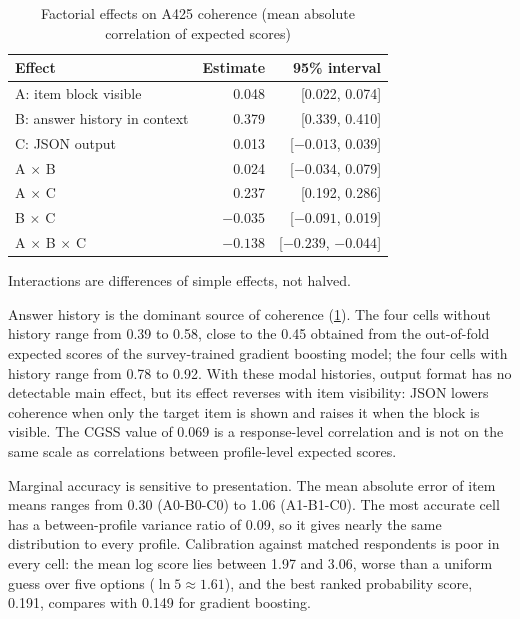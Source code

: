 \documentclass[11pt]{article}
\begin{document}
\begin{table}[H]
\centering
\caption{Factorial effects on A425 coherence (mean absolute correlation of expected scores)}
\label{tab:v2effects}
\small
\begin{tabular}{lrr}
\toprule
Effect & Estimate & 95\% interval \\
\midrule
A: item block visible & 0.048 & [0.022, 0.074] \\
B: answer history in context & 0.379 & [0.339, 0.410] \\
C: JSON output & 0.013 & [$-0.013$, 0.039] \\
A $\times$ B & 0.024 & [$-0.034$, 0.079] \\
A $\times$ C & 0.237 & [0.192, 0.286] \\
B $\times$ C & $-0.035$ & [$-0.091$, 0.019] \\
A $\times$ B $\times$ C & $-0.138$ & [$-0.239$, $-0.044$] \\
\bottomrule
\end{tabular}
\begin{tablenotes}\footnotesize
\item Interactions are differences of simple effects, not halved.
\end{tablenotes}
\end{table}

Answer history is the dominant source of coherence (\cref{tab:v2effects}). The four cells without history range from 0.39 to 0.58, close to the 0.45 obtained from the out-of-fold expected scores of the survey-trained gradient boosting model; the four cells with history range from 0.78 to 0.92. With these modal histories, output format has no detectable main effect, but its effect reverses with item visibility: JSON lowers coherence when only the target item is shown and raises it when the block is visible. The CGSS value of 0.069 is a response-level correlation and is not on the same scale as correlations between profile-level expected scores.

Marginal accuracy is sensitive to presentation. The mean absolute error of item means ranges from 0.30 (A0-B0-C0) to 1.06 (A1-B1-C0). The most accurate cell has a between-profile variance ratio of 0.09, so it gives nearly the same distribution to every profile. Calibration against matched respondents is poor in every cell: the mean log score lies between 1.97 and 3.06, worse than a uniform guess over five options ($\ln 5 \approx 1.61$), and the best ranked probability score, 0.191, compares with 0.149 for gradient boosting.
\end{document}
